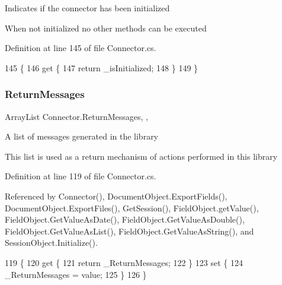 Indicates if the connector has been initialized 

When not initialized no other methods can be executed

Definition at line 145 of file Connector.\+cs.


\begin{DoxyCode}
145                               \{
146         \textcolor{keyword}{get} \{
147             \textcolor{keywordflow}{return} \_isInitialized;
148         \}
149     \}
\end{DoxyCode}
\mbox{\label{class_connector_a1ed422674b344524fd77998dcf6a9ba6}} 
\subsubsection{\texorpdfstring{Return\+Messages}{ReturnMessages}}
{\footnotesize\ttfamily Array\+List Connector.\+Return\+Messages\hspace{0.3cm}{\ttfamily [static]}, {\ttfamily [get]}, {\ttfamily [set]}}



A list of messages generated in the library 

This list is used as a return mechanism of actions performed in this library

Definition at line 119 of file Connector.\+cs.



Referenced by Connector(), Document\+Object.\+Export\+Fields(), Document\+Object.\+Export\+Files(), Get\+Session(), Field\+Object.\+get\+Value(), Field\+Object.\+Get\+Value\+As\+Date(), Field\+Object.\+Get\+Value\+As\+Double(), Field\+Object.\+Get\+Value\+As\+List(), Field\+Object.\+Get\+Value\+As\+String(), and Session\+Object.\+Initialize().


\begin{DoxyCode}
119                                            \{
120         \textcolor{keyword}{get} \{
121             \textcolor{keywordflow}{return} \_ReturnMessages;
122         \}
123         \textcolor{keyword}{set} \{
124             \_ReturnMessages = value;
125         \}
126     \}
\end{DoxyCode}
\mbox{\label{class_connector_a0a7bb42f9530796c086ab50785147ce9}} 
